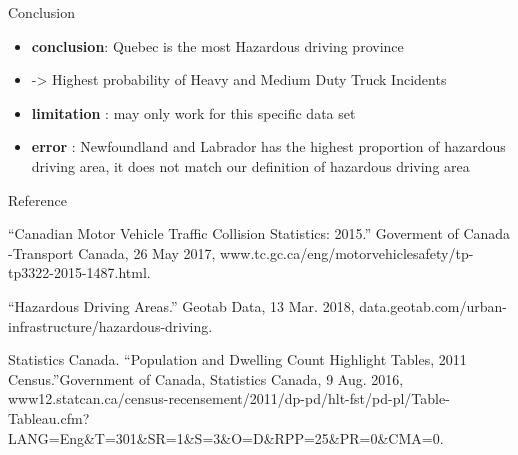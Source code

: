 \documentclass[ignorenonframetext,]{beamer}
\providecommand{\tightlist}{%
  \setlength{\itemsep}{0pt}\setlength{\parskip}{0pt}}
\begin{document}
\begin{frame}{Conclusion}

\begin{itemize}
\tightlist
\item
  \textbf{conclusion}: Quebec is the most Hazardous driving province
\item
  -\textgreater{} Highest probability of Heavy and Medium Duty Truck
  Incidents
\item
  \textbf{limitation} : may only work for this specific data set
\item
  \textbf{error} : Newfoundland and Labrador has the highest proportion
  of hazardous driving area, it does not match our definition of
  hazardous driving area
\end{itemize}

\end{frame}

\begin{frame}{Reference}

``Canadian Motor Vehicle Traffic Collision Statistics: 2015.'' Goverment
of Canada -Transport Canada, 26 May 2017,
www.tc.gc.ca/eng/motorvehiclesafety/tp-tp3322-2015-1487.html.

``Hazardous Driving Areas.'' Geotab Data, 13 Mar. 2018,
data.geotab.com/urban-infrastructure/hazardous-driving.

Statistics Canada. ``Population and Dwelling Count Highlight Tables,
2011 Census.''Government of Canada, Statistics Canada, 9 Aug. 2016,
www12.statcan.ca/census-recensement/2011/dp-pd/hlt-fst/pd-pl/Table-Tableau.cfm?LANG=Eng\&T=301\&SR=1\&S=3\&O=D\&RPP=25\&PR=0\&CMA=0.

\end{frame}
\end{document}
